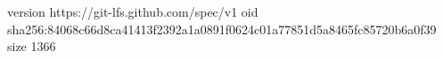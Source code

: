 version https://git-lfs.github.com/spec/v1
oid sha256:84068c66d8ca41413f2392a1a0891f0624c01a77851d5a8465fc85720b6a0f39
size 1366
